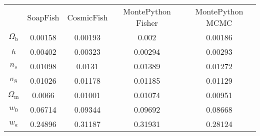 \begin{table}
\centering
\begin{tabular}{|c|c|c|c|c|}
 & SoapFish & CosmicFish & MontePython Fisher & MontePython MCMC \\
$\Omega_\mathrm{b}$ & 0.00158 & 0.00193 & 0.002 & 0.00186 \\
$h$ & 0.00402 & 0.00323 & 0.00294 & 0.00293 \\
$n_s$ & 0.01098 & 0.0131 & 0.01389 & 0.01272 \\
$\sigma_8$ & 0.01026 & 0.01178 & 0.01185 & 0.01129 \\
$\Omega_\mathrm{m}$ & 0.0066 & 0.01001 & 0.01074 & 0.00951 \\
$w_0$ & 0.06714 & 0.09344 & 0.09692 & 0.08668 \\
$w_a$ & 0.24896 & 0.31187 & 0.31931 & 0.28124 \\
\end{tabular}
\end{table}
